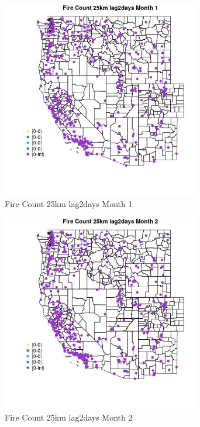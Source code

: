 \begin{figure} 
\centering  
\includegraphics[width=0.77\textwidth]{Code_Outputs/Report_ML_input_PM25_Step4_part_e_de_duplicated_aves_compiled_2019-05-18wNAs_MapObsMo1Fire_Count_25km_lag2days.jpg} 
\caption{\label{fig:Report_ML_input_PM25_Step4_part_e_de_duplicated_aves_compiled_2019-05-18wNAsMapObsMo1Fire_Count_25km_lag2days}Fire Count 25km lag2days Month 1} 
\end{figure} 
 

\begin{figure} 
\centering  
\includegraphics[width=0.77\textwidth]{Code_Outputs/Report_ML_input_PM25_Step4_part_e_de_duplicated_aves_compiled_2019-05-18wNAs_MapObsMo2Fire_Count_25km_lag2days.jpg} 
\caption{\label{fig:Report_ML_input_PM25_Step4_part_e_de_duplicated_aves_compiled_2019-05-18wNAsMapObsMo2Fire_Count_25km_lag2days}Fire Count 25km lag2days Month 2} 
\end{figure} 
 

